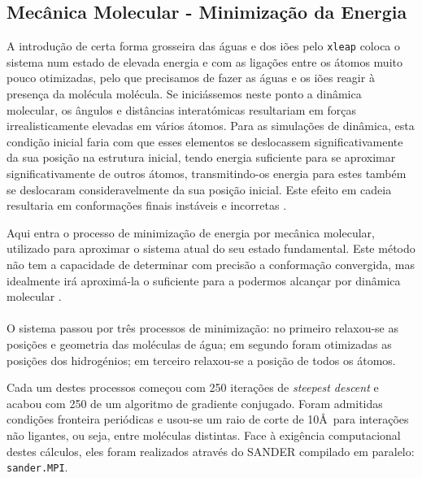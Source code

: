 \documentclass[12pt,a4paper]{article}
\begin{document}
\subsection{Mecânica Molecular - Minimização da Energia}
	A introdução de certa forma grosseira das águas e dos iões pelo \verb|xleap| coloca o sistema num estado de elevada energia e com as ligações entre os átomos muito pouco otimizadas, pelo que precisamos de fazer as águas e os iões reagir à presença da molécula molécula. Se iniciássemos neste ponto a dinâmica molecular, os ângulos e distâncias interatómicas resultariam em forças irrealisticamente elevadas em vários átomos. Para as simulações de dinâmica, esta condição inicial faria com que esses elementos se deslocassem significativamente da sua posição na estrutura inicial, tendo energia suficiente para se aproximar significativamente de outros átomos, transmitindo-os energia para estes também se deslocaram consideravelmente da sua posição inicial. Este efeito em cadeia resultaria em conformações finais instáveis e incorretas \cite{cheathamMolecularModelingNucleic2001}.
	
	Aqui entra o processo de minimização de energia por mecânica molecular, utilizado para aproximar o sistema atual do seu estado fundamental. Este método não tem a capacidade de determinar com precisão a conformação convergida, mas idealmente irá aproximá-la o suficiente para a podermos alcançar por dinâmica molecular \cite{cheathamMolecularModelingNucleic2001,galindo-murilloMolecularModelingNucleic2014}.\paragraph{}
	
	O sistema passou por três processos de minimização: no primeiro relaxou-se as posições e geometria das moléculas de água; em segundo foram otimizadas as posições dos hidrogénios; em terceiro relaxou-se a posição de todos os átomos.
	
	Cada um destes processos começou com 250 iterações de \textit{steepest descent} e acabou com 250 de um algoritmo de gradiente conjugado. Foram admitidas condições fronteira periódicas e usou-se um raio de corte de 10\AA \ para interações não ligantes, ou seja, entre moléculas distintas. Face à exigência computacional destes cálculos, eles foram realizados através do SANDER compilado em paralelo: \verb|sander.MPI|.
	
\end{document}
